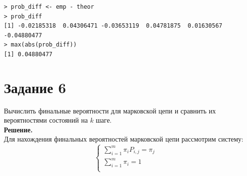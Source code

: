 \documentclass[14pt,a4paper]{scrartcl}
\begin{document}
\begin{verbatim}
> prob_diff <- emp - theor
> prob_diff
[1] -0.02185318  0.04306471 -0.03653119  0.04781875  0.01630567 -0.04880477
> max(abs(prob_diff))
[1] 0.04880477
\end{verbatim}


\section*{Задание 6}
Вычислить финальные вероятности для марковской цепи и сравнить их  вероятностями состояний на $k$ шаге.\\
\textbf{Решение.}\\

Для нахождения финальных вероятностей марковской цепи рассмотрим систему:
\begin{equation*}
	\begin{cases} 
		\sum\limits_{i=1}^m \pi_i P_{i,j} = \pi_j\\ 
		\sum\limits_{i=1}^m \pi_i = 1\\ 
	\end{cases}
\end{equation*}
\end{document}
